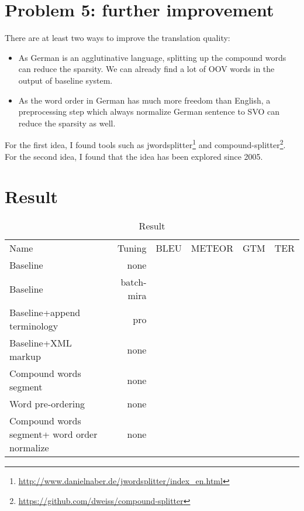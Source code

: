 \documentclass[a4paper]{article}
\begin{document}
\section{Problem 5: further improvement}
There are at least two ways to improve the translation quality:
\begin{itemize}
    \item As German is an agglutinative language, splitting up the compound words can reduce the sparsity. We can already find a lot of OOV words in the output of baseline system.
    \item As the word order in German has much more freedom than English, a preprocessing step which always normalize German sentence to SVO can reduce the sparsity as well.
\end{itemize}
For the first idea, I found tools such as jwordsplitter\footnote{\url{http://www.danielnaber.de/jwordsplitter/index_en.html}} and compound-splitter\footnote{\url{https://github.com/dweiss/compound-splitter}}. 
For the second idea, I found that the idea has been explored since 2005.


\section{Result}
\begin{table}
    \centering
    \begin{tabular}{l|r|r|r|r|r}
        Name & Tuning & BLEU & METEOR & GTM & TER \\
        Baseline & none& & & & \\
        Baseline & batch-mira & & & & \\
        Baseline+append terminology & pro & & & & \\
        Baseline+XML markup & none & & & &\\
        Compound words segment & none & & & &\\
        Word pre-ordering & none & & & &\\
        Compound words segment+ word order normalize & none & & & &\\
    \end{tabular}
    \caption{Result}
    \label{tab:result}
\end{table}
\end{document}
